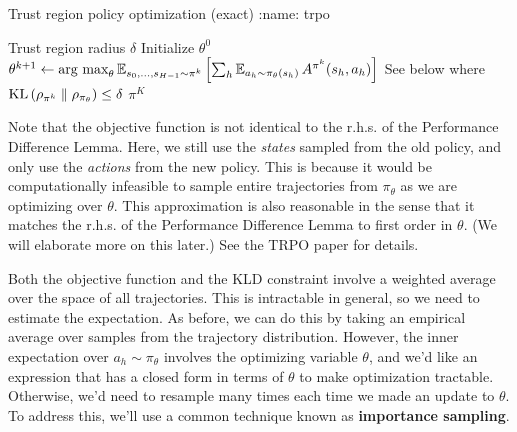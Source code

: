 \documentclass[\main/main]{subfiles}
\begin{document}
\begin{definition}{Trust region policy optimization (exact)}
:name: trpo

    \begin{algorithmic}
        \Require Trust region radius $\delta$
        \State Initialize $\theta^0$
        \State $\theta^{k+1} \gets \operatorname*{\textrm{arg\ max}}_{\theta} \operatorname*{\mathbb{E}}_{s_0, \dots, s_{H-1} \sim \pi^k} \left[ \sum_h \operatorname*{\mathbb{E}}_{a_h \sim \pi_\theta(s_h)} A^{\pi^k}(s_h, a_h) \right]$
        \Comment See below
        \State where $\mathrm{KL}\left(\rho_{\pi^k} \parallel \rho_{\pi_{\theta}}\right) \le \delta$
        \EndFor
        \State \Return $\pi^K$
    \end{algorithmic}

    Note that the objective function is not identical to the r.h.s. of the Performance Difference Lemma. Here, we still use the \emph{states} sampled from the old policy, and only use the \emph{actions} from the new policy.
    This is because it would be computationally infeasible to sample entire trajectories from $\pi_\theta$ as we are optimizing over $\theta$.
    This approximation is also reasonable in the sense that it matches the r.h.s. of the Performance Difference Lemma to first order in $\theta$. (We will elaborate more on this later.)
    See the TRPO paper for details.
\end{definition}

Both the objective function and the KLD constraint involve a weighted average over the space of all trajectories. This is intractable in general, so we need to estimate the expectation.
As before, we can do this by taking an empirical average over samples from the trajectory distribution.
However, the inner expectation over $a_h \sim \pi_{\theta}$ involves the optimizing variable $\theta$, and we'd like an expression that has a closed form in terms of $\theta$ to make optimization tractable. Otherwise, we'd need to resample many times each time we made an update to $\theta$.
To address this, we'll use a common technique known as \textbf{importance sampling}.
\end{document}
